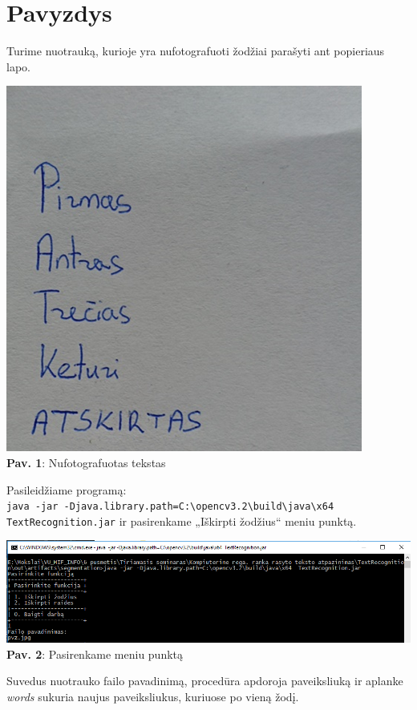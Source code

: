 \documentclass[a4paper,12pt]{article}
\begin{document}
\newpage
\section{Pavyzdys}
Turime nuotrauką, kurioje yra nufotografuoti žodžiai parašyti ant popieriaus lapo.
\begin{center}
	\includegraphics[scale=0.75]{img/1.png}\\
	\textbf{Pav. 1}: Nufotografuotas tekstas\\
\end{center}

Pasileidžiame programą:\\
\verb|java -jar -Djava.library.path=C:\opencv3.2\build\java\x64 TextRecognition.jar|
ir pasirenkame  „Iškirpti žodžius“ meniu punktą.

\begin{center}
	\includegraphics[scale=0.7]{img/2.png}\\
	\textbf{Pav. 2}: Pasirenkame meniu punktą\\
\end{center}
Suvedus nuotrauko failo pavadinimą, procedūra apdoroja paveiksliuką ir aplanke \textit{words} sukuria naujus paveiksliukus, kuriuose po vieną žodį.
 
\end{document}
